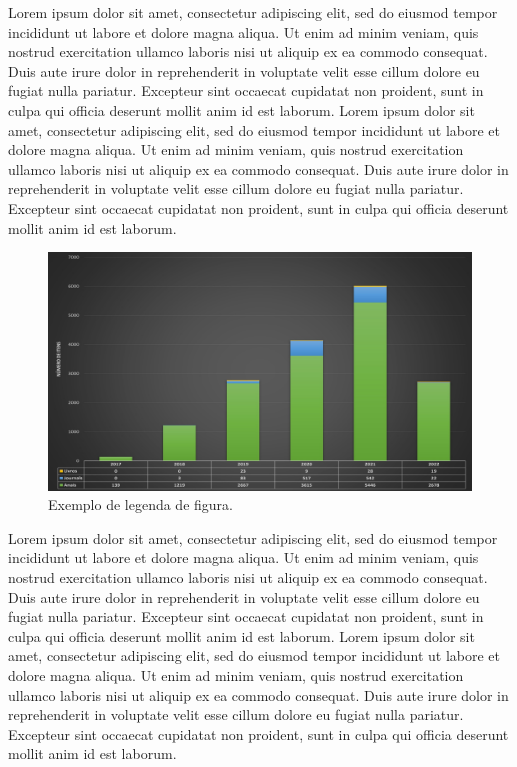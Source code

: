\documentclass[portuguese]{sbc2025}%
\begin{document}
Lorem ipsum dolor sit amet, consectetur adipiscing elit, sed do eiusmod tempor incididunt ut labore et dolore magna aliqua. Ut enim ad minim veniam, quis nostrud exercitation ullamco laboris nisi ut aliquip ex ea commodo consequat. Duis aute irure dolor in reprehenderit in voluptate velit esse cillum dolore eu fugiat nulla pariatur. Excepteur sint occaecat cupidatat non proident, sunt in culpa qui officia deserunt mollit anim id est laborum. Lorem ipsum dolor sit amet, consectetur adipiscing elit, sed do eiusmod tempor incididunt ut labore et dolore magna aliqua. Ut enim ad minim veniam, quis nostrud exercitation ullamco laboris nisi ut aliquip ex ea commodo consequat. Duis aute irure dolor in reprehenderit in voluptate velit esse cillum dolore eu fugiat nulla pariatur. Excepteur sint occaecat cupidatat non proident, sunt in culpa qui officia deserunt mollit anim id est laborum.

\begin{figure}
\begin{center}
\includegraphics[width=\columnwidth]{sol.jpg}
\caption{Exemplo de legenda de figura.}\label{Fig1}
\end{center}
\end{figure}

Lorem ipsum dolor sit amet, consectetur adipiscing elit, sed do eiusmod tempor incididunt ut labore et dolore magna aliqua. Ut enim ad minim veniam, quis nostrud exercitation ullamco laboris nisi ut aliquip ex ea commodo consequat. Duis aute irure dolor in reprehenderit in voluptate velit esse cillum dolore eu fugiat nulla pariatur. Excepteur sint occaecat cupidatat non proident, sunt in culpa qui officia deserunt mollit anim id est laborum. Lorem ipsum dolor sit amet, consectetur adipiscing elit, sed do eiusmod tempor incididunt ut labore et dolore magna aliqua. Ut enim ad minim veniam, quis nostrud exercitation ullamco laboris nisi ut aliquip ex ea commodo consequat. Duis aute irure dolor in reprehenderit in voluptate velit esse cillum dolore eu fugiat nulla pariatur. Excepteur sint occaecat cupidatat non proident, sunt in culpa qui officia deserunt mollit anim id est laborum.
\end{document}

